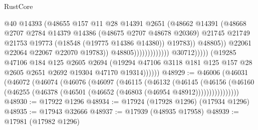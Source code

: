 \begin{lexlean}{RustCore}
\begin{coremodule}
                                                      @40
                                                      @14393
                                                      (@48655
                                                        @157
                                                        @11
                                                        @28
                                                        @14391
                                                        @2651
                                                        (@48662
                                                          @14391
                                                          (@48668
                                                            @2707
                                                            @2784
                                                            @14379
                                                            @14386
                                                            (@48675 @2707 @48678 @20369)
                                                            @21745
                                                            @21749
                                                            @21753
                                                            @19773
                                                            (@18548 (@19775 @14386 @14380))
                                                            @19783))
                                                        @48805))
                                                    @22061
                                                    @22064
                                                    @22067
                                                    @22070
                                                    @19783))
                                                @48805)))))))))))))
                      @30712)))))
            (@19285
              @47106
              @184
              @125
              @2605
              @2694
              (@19294 @47106 @3118 @181 @125 @157 @28 @2605 @2651 @2692 @19304 @47170 @19314))))))
@48929 := @46006
    (@46031
      (@46072
        (@46074
          (@46076
            (@46097
              (@46115
                (@46132
                  (@46145
                    (@46156
                      (@46160 (@46255 (@46378 (@46501 (@46652 (@46803 (@46954 @48912))))))))))))))))
@48930 := @17922 @1296
@48934 := @17924 (@17928 @1296) (@17934 @1296)
@48935 := @17943 @32666
@48937 := @17939 (@48935 @17958)
@48939 := @17981 (@17982 @1296)

\end{coremodule}
\end{lexlean}
